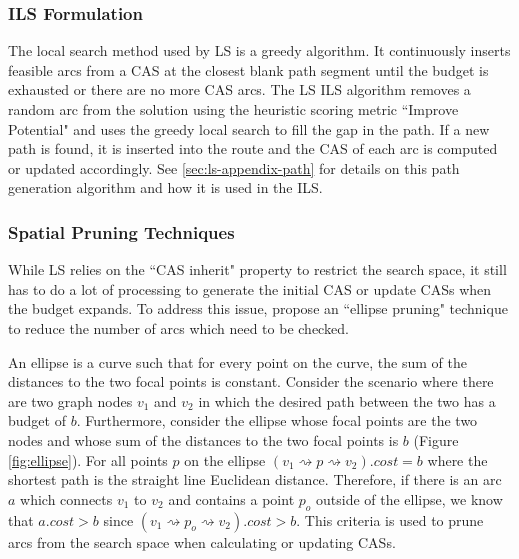 \documentclass[honors]{union-cs-thesis}
\newcommand{\spa}{\rightsquigarrow}
\newcommand{\td}{\todo[inline]}
\begin{document}
\td{Move the CAS to the appendix??}


\subsubsection{ILS Formulation}
The local search method used by LS is a greedy algorithm. It continuously inserts feasible arcs from a CAS at the closest blank path segment until the budget is exhausted or there are no more CAS arcs. The LS ILS algorithm removes a random arc from the solution using the heuristic scoring metric ``Improve Potential" and uses the greedy local search to fill the gap in the path. If a new path is found, it is inserted into the route and the CAS of each arc is computed or updated accordingly. See \cref{sec:ls-appendix-path} for details on this path generation algorithm and how it is used in the ILS. 


\subsubsection{Spatial Pruning Techniques}\label{sec:pruning}
While LS relies on the ``CAS inherit" property to restrict the search space, it still has to do a lot of processing to generate the initial CAS or update CASs when the budget expands. To address this issue,  \citeauthor{lu2015arc} propose an ``ellipse pruning" technique to reduce the number of arcs which need to be checked.


An ellipse is a curve such that for every point on the curve, the sum of the distances to the two focal points is constant. Consider the scenario where there are two graph nodes $v_1$ and $v_2$ in which the desired path between the two has a budget of $b$. Furthermore, consider the ellipse whose focal points are the two nodes and whose sum of the distances to the two focal points is $b$ (Figure \ref{fig:ellipse}). For all points $p$ on the ellipse $(v_1 \spa p \spa v_2).cost = b$ where the shortest path is the straight line Euclidean distance. Therefore, if there is an arc $a$ which connects $v_1$ to $v_2$ and contains a point $p_o$ outside of the ellipse, we know that $a.cost > b$ since $(v_1 \spa p_o \spa v_2).cost > b$. This criteria is used to prune arcs from the search space when calculating or updating CASs.
\end{document}
